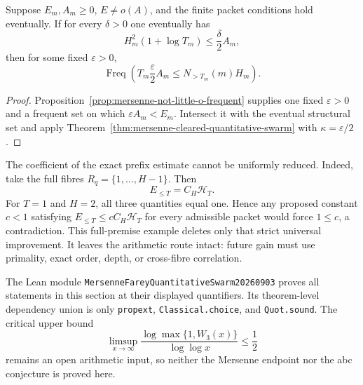 \begin{corollary}
\label{cor:mersenne-frequent-quantitative-swarm}
Suppose $E_m,A_m\ge0$, $E\ne o(A)$, and the finite packet conditions hold
eventually.  If for every $\delta>0$ one eventually has
\[
 H_m^2(1+\log T_m)\le\frac{\delta}{2}A_m,
\]
then for some fixed $\varepsilon>0$,
\[
 \operatorname{Freq}\left(
 T_m\frac{\varepsilon}{2}A_m\le N_{>T_m}(m)H_m
 \right).
\]
\end{corollary}

\begin{proof}
Proposition~\ref{prop:mersenne-not-little-o-frequent} supplies one fixed
$\varepsilon>0$ and a frequent set on which
$\varepsilon A_m<E_m$.  Intersect it with the eventual structural set and
apply Theorem~\ref{thm:mersenne-cleared-quantitative-swarm} with
$\kappa=\varepsilon/2$.
\end{proof}

The coefficient of the exact prefix estimate cannot be uniformly reduced.
Indeed, take the full fibres $R_q=\{1,\ldots,H-1\}$.  Then
\[
 E_{\le T}=C_H\mathcal H_T.
\]
For $T=1$ and $H=2$, all three quantities equal one.  Hence any proposed
constant $c<1$ satisfying
$E_{\le T}\le cC_H\mathcal H_T$ for every admissible packet would force
$1\le c$, a contradiction.  This full-premise example deletes only that
strict universal improvement.  It leaves the arithmetic route intact:
future gain must use primality, exact order, depth, or cross-fibre
correlation.

The Lean module
\texttt{MersenneFareyQuantitativeSwarm20260903} proves all statements in
this section at their displayed quantifiers.  Its theorem-level dependency
union is only \texttt{propext}, \texttt{Classical.choice}, and
\texttt{Quot.sound}.  The critical upper bound
\[
 \limsup_{x\to\infty}
 \frac{\log\max\{1,W_3(x)\}}{\log\log x}\le\frac12
\]
remains an open arithmetic input, so neither the Mersenne endpoint nor the
abc conjecture is proved here.
